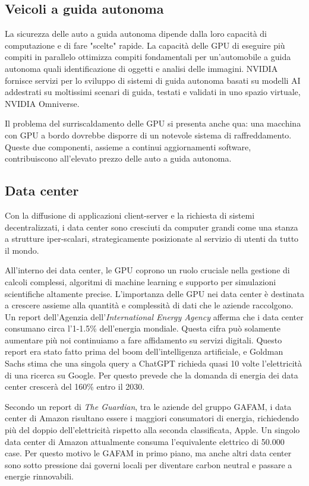 \documentclass[12pt,a4paper,oneside]{book}
\begin{document}
\subsection{Veicoli a guida autonoma}

La sicurezza delle auto a guida autonoma dipende dalla loro capacità di computazione e di fare "scelte" rapide. La capacità delle GPU di eseguire più compiti in parallelo ottimizza compiti fondamentali per un'automobile a guida autonoma quali identificazione di oggetti e analisi delle immagini. NVIDIA fornisce servizi per lo sviluppo di sistemi di guida autonoma basati su modelli AI addestrati su moltissimi scenari di guida, testati e validati in uno spazio virtuale, NVIDIA Omniverse.

Il problema del surriscaldamento delle GPU si presenta anche qua: una macchina con GPU a bordo dovrebbe disporre di un notevole sistema di raffreddamento. Queste due componenti, assieme a continui aggiornamenti software, contribuiscono all'elevato prezzo delle auto a guida autonoma.

\subsection{Data center}

Con la diffusione di applicazioni client-server e la richiesta di sistemi decentralizzati, i data center sono cresciuti da computer grandi come una stanza a strutture iper-scalari, strategicamente posizionate al servizio di utenti da tutto il mondo. 

All'interno dei data center, le GPU coprono un ruolo cruciale nella gestione di calcoli complessi, algoritmi di machine learning e supporto per simulazioni scientifiche altamente precise. L'importanza delle GPU nei data center è destinata a crescere assieme alla quantità e complessità di dati che le aziende raccolgono. Un report dell'Agenzia dell'\textit{International Energy Agency} afferma che i data center consumano circa l'1-1.5\% dell'energia mondiale. Questa cifra può solamente aumentare più noi continuiamo a fare affidamento su servizi digitali. Questo report era stato fatto prima del boom dell'intelligenza artificiale, e Goldman Sachs stima che una singola query a ChatGPT richieda quasi 10 volte l'elettricità di una ricerca su Google. Per questo prevede che la domanda di energia dei data center crescerà del 160\% entro il 2030.

Secondo un report di \textit{The Guardian}, tra le aziende del gruppo GAFAM, i data center di Amazon risultano essere i maggiori consumatori di energia, richiedendo più del doppio dell'elettricità rispetto alla seconda classificata, Apple. Un singolo data center di Amazon attualmente consuma l'equivalente elettrico di 50.000 case. Per questo motivo le GAFAM in primo piano, ma anche altri data center sono sotto pressione dai governi locali per diventare carbon neutral e passare a energie rinnovabili.
\end{document}
